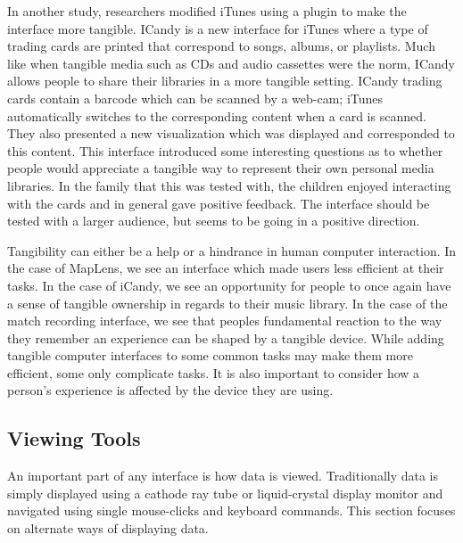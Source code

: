 In another study, researchers modified iTunes using a plugin to make the interface more tangible.  ICandy \cite{1358681} is a new interface for iTunes where a type of trading cards are printed that correspond to songs, albums, or playlists.  Much like when tangible media such as CDs and audio cassettes were the norm, ICandy allows people to share their libraries in a more tangible setting. ICandy trading cards contain a barcode which can be scanned by a web-cam; iTunes automatically switches to the corresponding content when a card is scanned. They also presented a new visualization which was displayed and corresponded to this content. This interface introduced some interesting questions as to whether people would appreciate a tangible way to represent their own personal media libraries.  In the family that this was tested with, the children enjoyed interacting with the cards and in general gave positive feedback.  The interface should be tested with a larger audience, but seems to be going in a positive direction.

Tangibility can either be a help or a hindrance in human computer interaction.  In the case of MapLens, we see an interface which made users less efficient at their tasks.  In the case of iCandy, we see an opportunity for people to once again have a sense of tangible ownership in regards to their music library.  In the case of the match recording interface, we see that peoples fundamental reaction to the way they remember an experience can be shaped by a tangible device.  While adding tangible computer interfaces to some common tasks may make them more efficient, some only complicate tasks.  It is also important to consider how a person's experience is affected by the device they are using.

\subsection{Viewing Tools}
An important part of any interface is how data is viewed.  Traditionally data is simply displayed using a cathode ray tube or liquid-crystal display monitor and navigated using single mouse-clicks and keyboard commands.  This section focuses on alternate ways of displaying data.

